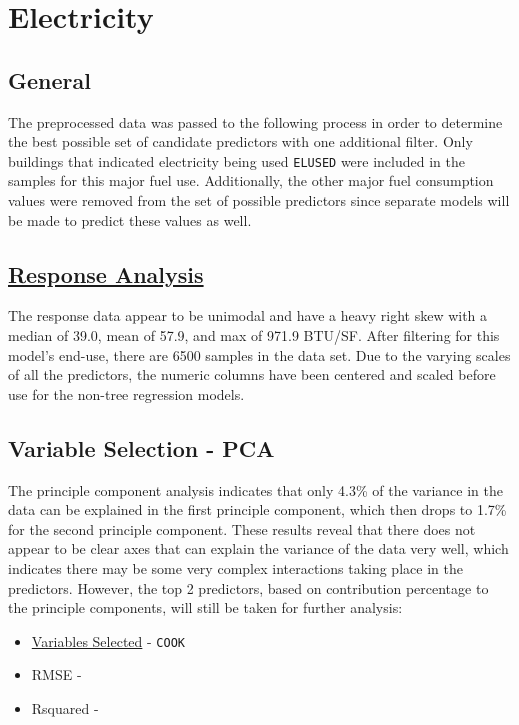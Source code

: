 \section*{Electricity}
\label{sec:electricity}

\subsection{General}

The preprocessed data was passed to the following process in order to determine the best possible set of candidate predictors with one additional filter.  Only buildings that indicated electricity being used \lstinline{ELUSED} were included in the samples for this major fuel use.  Additionally, the other major fuel consumption values were removed from the set of possible predictors since separate models will be made to predict these values as well.

\subsection{\hyperref[appendix:electricity:response]{Response Analysis}}

The response data appear to be unimodal and have a heavy right skew with a median of 39.0, mean of 57.9, and max of 971.9 BTU/SF.  After filtering for this model's end-use, there are 6500 samples in the data set.  Due to the varying scales of all the predictors, the numeric columns have been centered and scaled before use for the non-tree regression models.

\subsection{Variable Selection - PCA}

The principle component analysis indicates that only 4.3\% of the variance in the data can be explained in the first principle component, which then drops to 1.7\% for the second principle component.  These results reveal that there does not appear to be clear axes that can explain the variance of the data very well, which indicates there may be some very complex interactions taking place in the predictors.  However, the top 2 predictors, based on contribution percentage to the principle components, will still be taken for further analysis:

\begin{itemize}
\item \hyperref[appendix:electricity:pca]{Variables Selected} - \lstinline{COOK}
\item RMSE - 
\item Rsquared -
\end{itemize}

